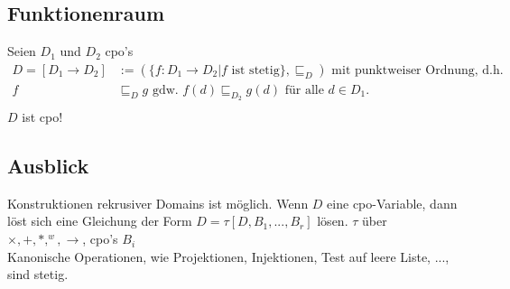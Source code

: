 \subsection{Funktionenraum}
Seien $D_1$ und $D_2$ cpo's
\begin{align*}
D = [D_1 \rightarrow D_2] &:= (\{ f : D_1 \rightarrow D_2 | f \text{ ist stetig}\}, \sqsubseteq_{D}) \text{ mit punktweiser Ordnung, d.h.}\\
f &\sqsubseteq_{D} g \text{ gdw. } f(d) \sqsubseteq_{D_2} g(d) \text{ für alle } d \in D_1 \text{.} \\
\end{align*}
$D$ ist cpo!\\
\subsection{Ausblick}
Konstruktionen rekrusiver Domains ist möglich. Wenn $D$ eine cpo-Variable, dann löst sich eine Gleichung der Form $D = \tau [D, B_1,...,B_r]$ lösen. $\tau$ über $\times, +, *, ^w, \rightarrow $, cpo's $B_i$\\ 
Kanonische Operationen, wie Projektionen, Injektionen, Test auf leere Liste, ..., sind stetig.\\
